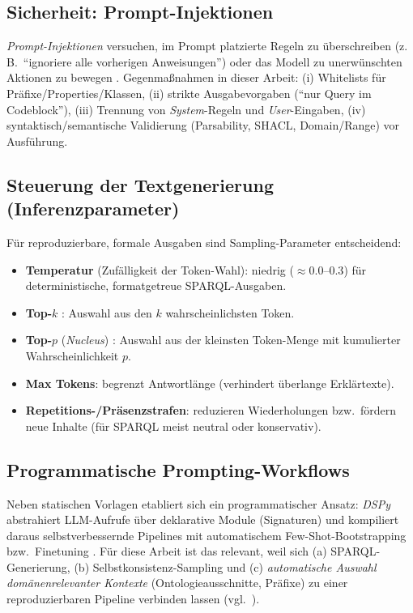 \subsection{Sicherheit: Prompt-Injektionen}
\emph{Prompt-Injektionen} versuchen, im Prompt platzierte Regeln zu überschreiben (z.\,B.\ \enquote{ignoriere alle vorherigen Anweisungen}) oder das Modell zu unerwünschten Aktionen zu bewegen \cite{campesatoLLMIntro}. Gegenmaßnahmen in dieser Arbeit:
(i) Whitelists für Präfixe/Properties/Klassen, 
(ii) strikte Ausgabevorgaben (\enquote{nur Query im Codeblock}), 
(iii) Trennung von \emph{System}-Regeln und \emph{User}-Eingaben, 
(iv) syntaktisch/semantische Validierung (Parsability, SHACL, Domain/Range) vor Ausführung.

\subsection{Steuerung der Textgenerierung (Inferenzparameter)}
Für reproduzierbare, formale Ausgaben sind Sampling-Parameter entscheidend:
\begin{itemize}
  \item \textbf{Temperatur} (Zufälligkeit der Token-Wahl): niedrig (${\approx}0.0$--$0.3$) für deterministische, formatgetreue SPARQL-Ausgaben.
  \item \textbf{Top-$k$} \cite{fan2018topk}: Auswahl aus den $k$ wahrscheinlichsten Token.
  \item \textbf{Top-$p$} (\emph{Nucleus}) \cite{holtzman2020degeneration}: Auswahl aus der kleinsten Token-Menge mit kumulierter Wahrscheinlichkeit $p$.
  \item \textbf{Max Tokens}: begrenzt Antwortlänge (verhindert überlange Erklärtexte).
  \item \textbf{Repetitions-/Präsenzstrafen}: reduzieren Wiederholungen bzw.\ fördern neue Inhalte (für SPARQL meist neutral oder konservativ).
\end{itemize}

\subsection{Programmatische Prompting-Workflows}
Neben statischen Vorlagen etabliert sich ein programmatischer Ansatz: \emph{DSPy} abstrahiert LLM-Aufrufe über deklarative Module (Signaturen) und kompiliert daraus selbstverbessernde Pipelines mit automatischem Few-Shot-Bootstrapping bzw.\ Finetuning \cite{khattab2023dspy}. Für diese Arbeit ist das relevant, weil sich (a) SPARQL-Generierung, (b) Selbstkonsistenz-Sampling und (c) \emph{automatische Auswahl domänenrelevanter Kontexte} (Ontologieausschnitte, Präfixe) zu einer reproduzierbaren Pipeline verbinden lassen (vgl.\ \cite{avila2024text2sparql}).

